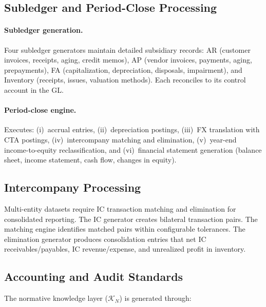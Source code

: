 \subsection{Subledger and Period-Close Processing}
\label{sec:gen_subledger}

\paragraph{Subledger generation.}
Four subledger generators maintain detailed subsidiary records:
AR (customer invoices, receipts, aging, credit memos),
AP (vendor invoices, payments, aging, prepayments),
FA (capitalization, depreciation, disposals, impairment),
and Inventory (receipts, issues, valuation methods).
Each reconciles to its control account in the GL.

\paragraph{Period-close engine.}
Executes: (i)~accrual entries, (ii)~depreciation postings,
(iii)~FX translation with CTA postings, (iv)~intercompany
matching and elimination, (v)~year-end income-to-equity
reclassification, and (vi)~financial statement generation
(balance sheet, income statement, cash flow, changes in equity).

\subsection{Intercompany Processing}
\label{sec:gen_intercompany}

Multi-entity datasets require IC transaction matching and elimination
for consolidated reporting.  The IC generator creates bilateral
transaction pairs.  The matching engine identifies matched pairs within
configurable tolerances.  The elimination generator produces
consolidation entries that net IC receivables/payables, IC
revenue/expense, and unrealized profit in inventory.

\subsection{Accounting and Audit Standards}
\label{sec:gen_standards}

The normative knowledge layer ($\mathcal{K}_N$) is generated through:

